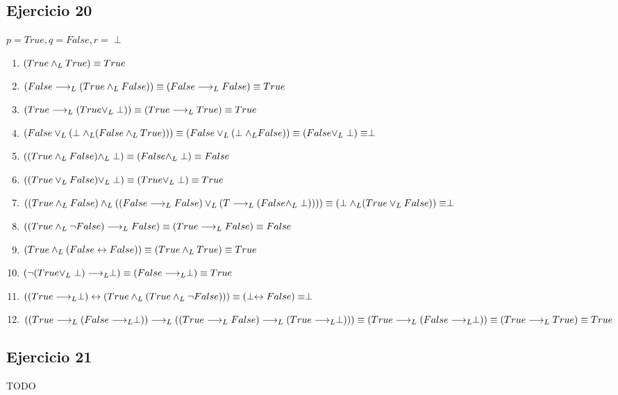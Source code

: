 	\subsection{Ejercicio 20}
		$p=True, q=False, r=\perp$
		\begin{enumerate}[label=(\alph*)]
		\item $(True \land _L True) \equiv True$
		\item $(False \longrightarrow _L (True \land _L False)) \equiv (False \longrightarrow _L False) \equiv True$
		\item $(True \longrightarrow _L (True \lor _L \perp)) \equiv (True \longrightarrow _L True)  \equiv True$
		\item $(False \lor _L (\perp \land _L (False \land _L True))) \equiv (False \lor _L (\perp \land _L False)) \equiv (False \lor _L \perp) \equiv \perp$
		\item $((True \land _L False)\land _L \perp) \equiv (False \land _L \perp) \equiv False$
		\item $((True \lor _L False)\lor _L \perp) \equiv (True \lor _L \perp) \equiv True$
		\item $((True\land _L False)\land _L((False \longrightarrow _L False)\lor _L(T\longrightarrow _L(False \land _L \perp)))) \equiv (\perp \land _L (True \lor _L False)) \equiv \perp$
		\item $((True \land _L \neg False)\longrightarrow _L False) \equiv (True \longrightarrow _L False) \equiv False$
		\item $(True \land _L(False \leftrightarrow False)) \equiv (True \land _L True) \equiv True$
		\item $(\neg (True \lor _L \perp)\longrightarrow _L \perp) \equiv (False \longrightarrow _L \perp) \equiv True$
		\item $((True \longrightarrow _L \perp)\leftrightarrow(True \land _L (True \land _L \neg False))) \equiv (\perp \leftrightarrow False) \equiv \perp$
		\item $((True \longrightarrow _L (False \longrightarrow _L \perp))\longrightarrow _L((True \longrightarrow _L False)\longrightarrow _L(True\longrightarrow _L \perp))) \equiv (True \longrightarrow _L (False \longrightarrow _L \perp)) \equiv (True \longrightarrow _L True) \equiv True$
		\end{enumerate}
	\subsection{Ejercicio 21}
		TODO

